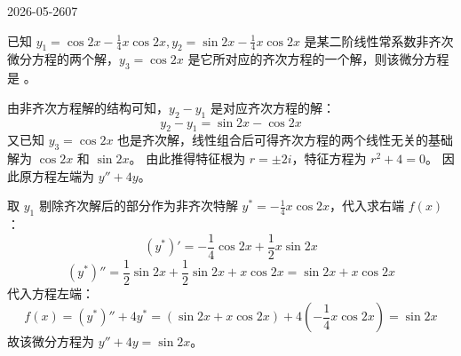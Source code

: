 \begin{mistake}{2026-05-26}{07}

\begin{problemcontent}
已知 \(y_1 = \cos 2x - \frac{1}{4}x\cos 2x, y_2 = \sin 2x - \frac{1}{4}x\cos 2x\) 是某二阶线性常系数非齐次微分方程的两个解，\(y_3 = \cos 2x\) 是它所对应的齐次方程的一个解，则该微分方程是 \underline{\hspace{2cm}}。
\end{problemcontent}

\begin{solutioncontent}
由非齐次方程解的结构可知，\(y_2 - y_1\) 是对应齐次方程的解：
\[ y_2 - y_1 = \sin 2x - \cos 2x \]
又已知 \(y_3 = \cos 2x\) 也是齐次解，线性组合后可得齐次方程的两个线性无关的基础解为 \(\cos 2x\) 和 \(\sin 2x\)。
由此推得特征根为 \(r = \pm 2i\)，特征方程为 \(r^2 + 4 = 0\)。
因此原方程左端为 \(y'' + 4y\)。

取 \(y_1\) 剔除齐次解后的部分作为非齐次特解 \(y^* = -\frac{1}{4}x\cos 2x\)，代入求右端 \(f(x)\)：
\[ (y^*)' = -\frac{1}{4}\cos 2x + \frac{1}{2}x\sin 2x \]
\[ (y^*)'' = \frac{1}{2}\sin 2x + \frac{1}{2}\sin 2x + x\cos 2x = \sin 2x + x\cos 2x \]
代入方程左端：
\[ f(x) = (y^*)'' + 4y^* = (\sin 2x + x\cos 2x) + 4\left(-\frac{1}{4}x\cos 2x\right) = \sin 2x \]
故该微分方程为 \(y'' + 4y = \sin 2x\)。
\end{solutioncontent}


\end{mistake}

